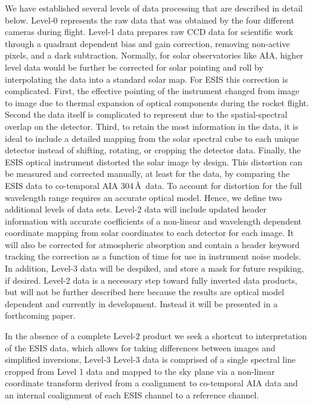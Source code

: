     We have established several levels of data processing that are described in detail below.
    Level-0 represents the raw data that was obtained by the four different cameras during flight.
    Level-1 data prepares raw CCD data for scientific work through a quadrant dependent bias and gain correction, removing non-active pixels, and a dark subtraction.
    Normally, for solar observatories like AIA, higher level data would be further be corrected for solar pointing and roll by interpolating the data into a standard solar map.  
    For ESIS this correction is complicated.  First, the effective pointing of the instrument changed from image to image due to thermal expansion of optical components during the rocket flight.  
    Second the data itself is complicated to represent due to the spatial-spectral overlap on the detector.  
    Third, to retain the most information in the data, it is ideal to include a detailed mapping from the solar spectral cube to each unique detector instead of shifting, rotating, or cropping the detector data.  
    Finally, the ESIS optical instrument distorted the solar image by design. 
    This distortion can be measured and corrected manually, at least for the \ov data, by comparing the ESIS data to co-temporal AIA 304\,\AA\ data.  
    To account for  distortion for the full wavelength range requires an accurate optical model.
    Hence, we define two additional levels of data sets.  
    Level-2 data will include updated header information with accurate coefficients of a non-linear and wavelength dependent coordinate mapping from solar coordinates to each detector for each image.   
    It will also be corrected for atmospheric absorption and contain a header keyword tracking the correction as a function of time for use in instrument noise models.
    In addition, Level-3 data will be despiked, and store a mask for future respiking, if desired.
    Level-2 data is a necessary step toward fully inverted data products,  but will not be further described here because the results are optical model dependent and currently in development.   
    Instead it will be presented in a forthcoming paper.  

    In the absence of a complete Level-2 product we seek a shortcut to interpretation of the ESIS data, which allows for taking differences between images and simplified inversions, Level-3
    Level-3 data is comprised of a single spectral line cropped from Level 1 data and mapped to the sky plane via a non-linear coordinate transform derived from a coalignment to co-temporal AIA data and an internal coalignment of each ESIS channel to a reference channel.
    
